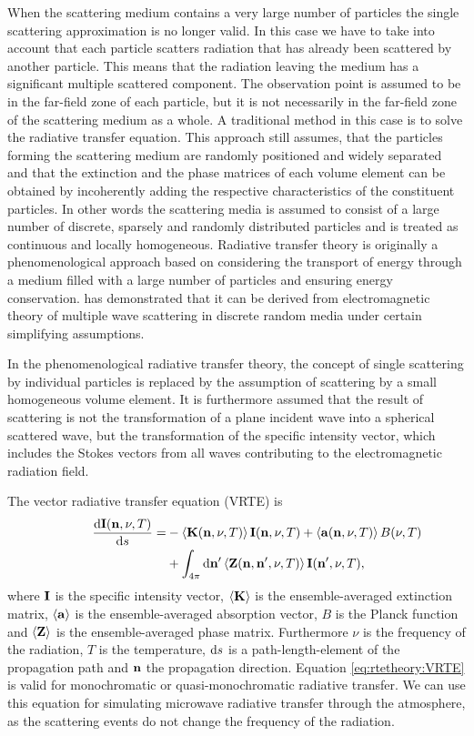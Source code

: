 When the scattering medium contains a very large number of particles
the single scattering approximation is no longer valid. In this case
we have to take into account that each particle scatters radiation
that has already been scattered by another particle. This means that
the radiation leaving the medium has a significant multiple scattered
component. The observation point is assumed to be in the far-field
zone of each particle, but it is not necessarily in the far-field zone
of the scattering medium as a whole. A traditional method in this case
is to solve the radiative transfer equation.  This approach still
assumes, that the particles forming the scattering medium are randomly
positioned and widely separated and that the extinction and the phase
matrices of each volume element can be obtained by incoherently adding
the respective characteristics of the constituent particles. In other
words the scattering media is assumed to consist of a large number of
discrete, sparsely and randomly distributed particles and is treated
as continuous and locally homogeneous.  Radiative transfer theory is
originally a phenomenological approach based on considering the
transport of energy through a medium filled with a large number of
particles and ensuring energy conservation.
\citet{mishchenko02:_vector} has demonstrated that it can be derived
from electromagnetic theory of multiple wave scattering in discrete
random media under certain simplifying assumptions.

In the phenomenological radiative transfer theory, the concept of
single scattering by individual particles is replaced by the
assumption of scattering by a small homogeneous volume element. It is
furthermore assumed that the result of scattering is not the
transformation of a plane incident wave into a spherical scattered
wave, but the transformation of the specific intensity vector, which
includes the Stokes vectors from all waves contributing to the
electromagnetic radiation field.

The vector radiative transfer equation (VRTE) is
\begin{eqnarray}
  \frac {\DiffD\StoVec(\PDir, \nu, T)}{\DiffD s} =
    &{}-\EnsAvr{\ExtMat(\PDir, \nu, T)} \StoVec(\PDir, \nu, T) +
    \EnsAvr{\AbsVec(\PDir, \nu, T)} \rlap{$B(\nu, T)$} \nonumber \\
    &{}+ \int_{4\pi} \DiffD\PDir' \EnsAvr{\PhaMat(\PDir, \PDir', \nu, T)} \StoVec(\PDir', \nu, T),
  \label{eq:rtetheory:VRTE}
  \end{eqnarray}
where ${\bf I}$ is the specific intensity vector, $\left\langle {\bf K} \right\rangle$ is the ensemble-averaged extinction matrix, $\left\langle {\bf a} \right\rangle$ is the ensemble-averaged absorption vector, $B$ is the
Planck function and $\left\langle {\bf Z} \right\rangle$ is the ensemble-averaged
phase matrix.  Furthermore $\nu$ is the frequency of the radiation,
$T$ is the temperature, $\mathrm{d} s$ is a path-length-element of the
propagation path and ${\bf n}$ the propagation direction.
Equation \ref{eq:rtetheory:VRTE} is valid for monochromatic or quasi-monochromatic
radiative transfer. We can use this equation for simulating microwave
radiative transfer through the atmosphere, as the scattering events do
not change the frequency of the radiation.

